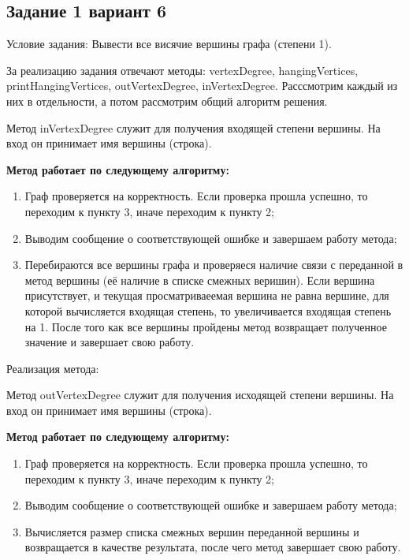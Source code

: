 \documentclass[bachelor, och, pract]{SCWorks}
\begin{document}

\bigskip

\subsection{Задание 1 вариант 6}

Условие задания: Вывести все висячие вершины графа (степени 1).
\bigskip

За реализацию задания отвечают методы: vertexDegree, hangingVertices,
printHangingVertices, outVertexDegree, inVertexDegree. Расссмотрим
каждый из них в отдельности, а потом рассмотрим общий алгоритм решения.
\bigskip

Метод inVertexDegree служит для получения входящей степени вершины.
На вход он принимает имя вершины (строка).
\smallskip

\textbf{Метод работает по следующему алгоритму:}

\begin{enumerate}
  \item {Граф проверяется на корректность. Если проверка прошла успешно,
  то переходим к пункту 3, иначе переходим к пункту 2;}
  \item {Выводим сообщение о соответствующей ошибке и завершаем работу метода;}
  \item {Перебираются все вершины графа и проверяеся наличие связи с переданной в
  метод вершины (её наличие в списке смежных веришин). Если вершина присутствует, и
  текущая просматриваеемая вершина не равна вершине, для которой вычисляется входящая степень,
  то увеличивается входящая степень на 1. После того как все вершины пройдены метод возвращает
  полученное значение и завершает свою работу.}
\end{enumerate}

Реализация метода:
\smallskip


\bigskip

Метод outVertexDegree служит для получения исходящей степени вершины. На вход
он принимает имя вершины (строка).
\smallskip

\textbf{Метод работает по следующему алгоритму:}

\begin{enumerate}
  \item {Граф проверяется на корректность. Если проверка прошла успешно,
  то переходим к пункту 3, иначе переходим к пункту 2;}
  \item {Выводим сообщение о соответствующей ошибке и завершаем работу метода;}
  \item {Вычисляется размер списка смежных вершин переданной вершины и возвращается
  в качестве результата, после чего метод завершает свою работу.}
\end{enumerate}
\end{document}
